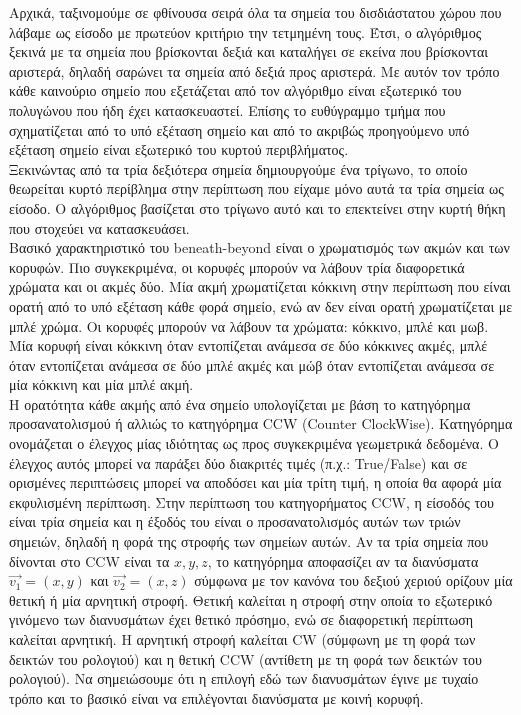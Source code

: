 \documentclass[12pt]{article}
\begin{document}
Αρχικά, ταξινομούμε σε φθίνουσα σειρά όλα τα σημεία του δισδιάστατου χώρου που λάβαμε ως είσοδο με πρωτεύον κριτήριο την τετμημένη τους. Έτσι, ο αλγόριθμος ξεκινά με τα σημεία που βρίσκονται δεξιά και καταλήγει σε εκείνα που βρίσκονται αριστερά, δηλαδή σαρώνει τα σημεία από δεξιά προς αριστερά. Με αυτόν τον τρόπο κάθε καινούριο σημείο που εξετάζεται από τον αλγόριθμο είναι εξωτερικό του πολυγώνου που ήδη έχει κατασκευαστεί. Επίσης το ευθύγραμμο τμήμα που σχηματίζεται από το υπό εξέταση σημείο και από το ακριβώς προηγούμενο υπό εξέταση σημείο είναι εξωτερικό του κυρτού περιβλήματος. \\

Ξεκινώντας από τα τρία δεξιότερα σημεία δημιουργούμε ένα τρίγωνο, το οποίο θεωρείται κυρτό περίβλημα στην περίπτωση που είχαμε μόνο αυτά τα τρία σημεία ως είσοδο. Ο αλγόριθμος βασίζεται στο τρίγωνο αυτό και το επεκτείνει στην κυρτή θήκη που στοχεύει να κατασκευάσει. \\

Βασικό χαρακτηριστικό του beneath-beyond είναι ο χρωματισμός των ακμών και των κορυφών. Πιο συγκεκριμένα, οι κορυφές μπορούν να λάβουν τρία διαφορετικά χρώματα και οι ακμές δύο. Μία ακμή χρωματίζεται κόκκινη στην περίπτωση που είναι ορατή από το υπό εξέταση κάθε φορά σημείο, ενώ αν δεν είναι ορατή χρωματίζεται με μπλέ χρώμα. Οι κορυφές μπορούν να λάβουν τα χρώματα: κόκκινο, μπλέ και μωβ. Μία κορυφή είναι κόκκινη όταν εντοπίζεται ανάμεσα σε δύο κόκκινες ακμές, μπλέ όταν εντοπίζεται ανάμεσα σε δύο μπλέ ακμές και μώβ όταν εντοπίζεται ανάμεσα σε μία κόκκινη και μία μπλέ ακμή. \\

Η ορατότητα κάθε ακμής από ένα σημείο υπολογίζεται με βάση το κατηγόρημα προσανατολισμού ή αλλιώς το κατηγόρημα CCW (Counter ClockWise). Κατηγόρημα ονομάζεται ο έλεγχος μίας ιδιότητας ως προς συγκεκριμένα γεωμετρικά δεδομένα. Ο έλεγχος αυτός μπορεί να παράξει δύο διακριτές τιμές (π.χ.: True/False) και σε ορισμένες περιπτώσεις μπορεί να αποδόσει και μία τρίτη τιμή, η οποία θα αφορά μία εκφυλισμένη περίπτωση. Στην περίπτωση του κατηγορήματος CCW, η είσοδός του είναι τρία σημεία και η έξοδός του είναι ο προσανατολισμός αυτών των τριών σημειών, δηλαδή η φορά της στροφής των σημείων αυτών. Αν τα τρία σημεία που δίνονται στο CCW είναι τα \(x,y,z\), το κατηγόρημα αποφασίζει αν τα διανύσματα \(\vec{v_1} = (x,y)\) και \(\vec{v_2} = (x,z)\) σύμφωνα με τον κανόνα του δεξιού χεριού ορίζουν μία θετική ή μία αρνητική στροφή. Θετική καλείται η στροφή στην οποία το εξωτερικό γινόμενο των διανυσμάτων έχει θετικό πρόσημο, ενώ σε διαφορετική περίπτωση καλείται αρνητική. Η αρνητική στροφή καλείται CW (σύμφωνη με τη φορά των δεικτών του ρολογιού) και η θετική CCW (αντίθετη με τη φορά των δεικτών του ρολογιού). Να σημειώσουμε ότι η επιλογή εδώ των διανυσμάτων έγινε με τυχαίο τρόπο και το βασικό είναι να επιλέγονται διανύσματα με κοινή κορυφή. \\
\end{document}
